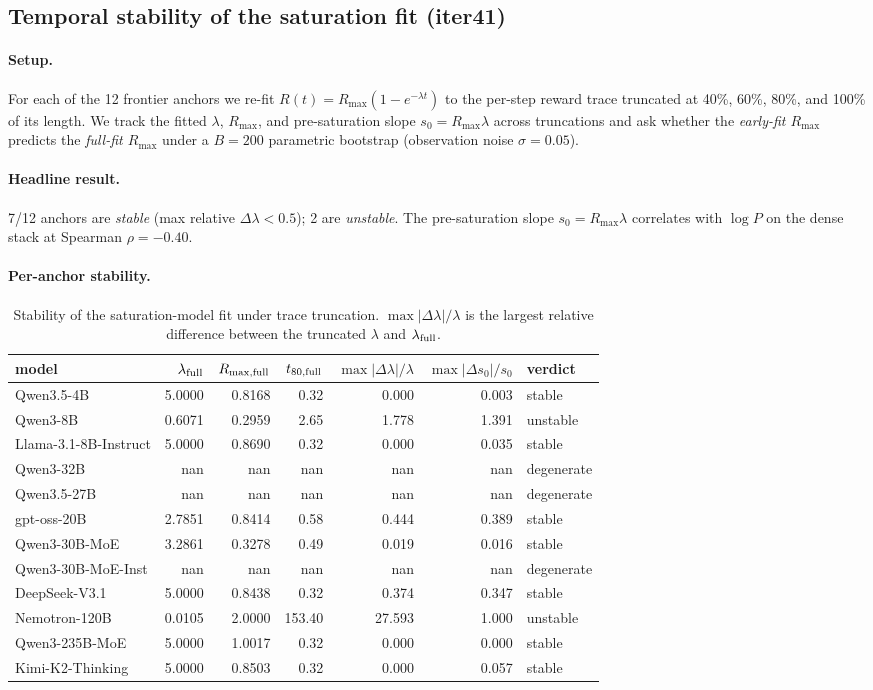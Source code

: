 \subsection{Temporal stability of the saturation fit (iter41)}
\label{sec:scaling-law-iter41}
\paragraph{Setup.} For each of the 12 frontier anchors we re-fit $R(t)=R_{\max}(1-e^{-\lambda t})$ to the per-step reward trace truncated at 40\%, 60\%, 80\%, and 100\% of its length. We track the fitted $\lambda$, $R_{\max}$, and pre-saturation slope $s_0=R_{\max}\lambda$ across truncations and ask whether the \emph{early-fit $R_{\max}$} predicts the \emph{full-fit $R_{\max}$} under a $B=200$ parametric bootstrap (observation noise $\sigma=0.05$).
\paragraph{Headline result.}
 7/12 anchors are \textit{stable} (max relative $\Delta\lambda<0.5$); 2 are \textit{unstable}. The pre-saturation slope $s_0=R_{\max}\lambda$ correlates with $\log P$ on the dense stack at Spearman $\rho=-0.40$.
\paragraph{Per-anchor stability.}
\begin{table}[ht]
\centering\small
\begin{tabular}{lrrrrrl}
\toprule
model & $\lambda_{\rm full}$ & $R_{\max,\rm full}$ & $t_{80,\rm full}$ & $\max|\Delta\lambda|/\lambda$ & $\max|\Delta s_0|/s_0$ & verdict \\
\midrule
 Qwen3.5-4B & 5.0000 & 0.8168 & 0.32 & 0.000 & 0.003 & stable \\
 Qwen3-8B & 0.6071 & 0.2959 & 2.65 & 1.778 & 1.391 & unstable \\
 Llama-3.1-8B-Instruct & 5.0000 & 0.8690 & 0.32 & 0.000 & 0.035 & stable \\
 Qwen3-32B & nan & nan & nan & nan & nan & degenerate \\
 Qwen3.5-27B & nan & nan & nan & nan & nan & degenerate \\
 gpt-oss-20B & 2.7851 & 0.8414 & 0.58 & 0.444 & 0.389 & stable \\
 Qwen3-30B-MoE & 3.2861 & 0.3278 & 0.49 & 0.019 & 0.016 & stable \\
 Qwen3-30B-MoE-Inst & nan & nan & nan & nan & nan & degenerate \\
 DeepSeek-V3.1 & 5.0000 & 0.8438 & 0.32 & 0.374 & 0.347 & stable \\
 Nemotron-120B & 0.0105 & 2.0000 & 153.40 & 27.593 & 1.000 & unstable \\
 Qwen3-235B-MoE & 5.0000 & 1.0017 & 0.32 & 0.000 & 0.000 & stable \\
 Kimi-K2-Thinking & 5.0000 & 0.8503 & 0.32 & 0.000 & 0.057 & stable \\
\bottomrule
\end{tabular}
\caption{Stability of the saturation-model fit under trace truncation. $\max|\Delta\lambda|/\lambda$ is the largest relative difference between the truncated $\lambda$ and $\lambda_{\rm full}$.}
\end{table}
